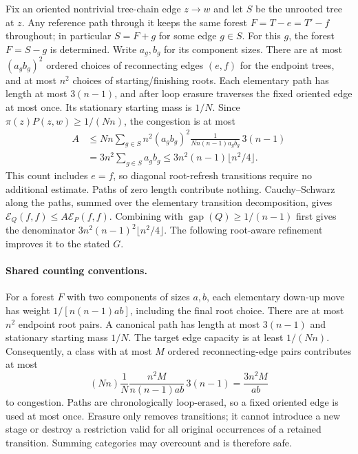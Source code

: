 \documentclass[11pt]{article}
\begin{document}
Fix an oriented nontrivial tree-chain edge $z\to w$ and let $S$ be
the unrooted tree at $z$. Any reference path through it keeps the
same forest $F=T-e=T'-f$ throughout; in particular $S=F+g$ for some
edge $g\in S$. For this $g$, the forest $F=S-g$ is determined.
Write $a_g,b_g$ for its component sizes. There are at most
$(a_gb_g)^2$ ordered choices of reconnecting edges $(e,f)$ for the
endpoint trees, and at most $n^2$ choices of starting/finishing roots.
Each elementary path has length at most $3(n-1)$, and after loop
erasure traverses the fixed oriented edge at most once. Its stationary
starting mass is $1/N$. Since $\pi(z)P(z,w)\ge1/(Nn)$, the congestion
is at most
\[
 \begin{split}
 A&\le Nn\sum_{g\in S}
 n^2(a_gb_g)^2\frac{1}{Nn(n-1)a_gb_g}\,3(n-1)\\
 &=3n^2\sum_{g\in S}a_gb_g
 \le3n^2(n-1)\lfloor n^2/4\rfloor.
 \end{split}
\]
This count includes $e=f$, so diagonal root-refresh transitions require
no additional estimate. Paths of zero length contribute nothing.
Cauchy--Schwarz along the paths, summed over the elementary transition
decomposition, gives $\mathcal E_Q(f,f)\le A\mathcal E_P(f,f)$.
Combining with $\operatorname{gap}(Q)\ge1/(n-1)$ first gives
the denominator $3n^2(n-1)^2\lfloor n^2/4\rfloor$. The following
root-aware refinement improves it to the stated $G$.

\paragraph{Shared counting conventions.}
For a forest $F$ with two components of sizes $a,b$, each elementary
down-up move has weight $1/[n(n-1)ab]$, including the final root choice.
There are at most $n^2$ endpoint root pairs. A canonical path has length
at most $3(n-1)$ and stationary starting mass $1/N$.
The target edge capacity is at least $1/(Nn)$. Consequently, a class
with at most $M$ ordered reconnecting-edge pairs contributes at most
\[
 (Nn)\frac{1}{N}\frac{n^2 M}{n(n-1)ab}\,3(n-1)
 =\frac{3n^2 M}{ab}
\]
to congestion. Paths are chronologically loop-erased, so a fixed
oriented edge is used at most once. Erasure only removes transitions;
it cannot introduce a new stage or destroy a restriction valid for
all original occurrences of a retained transition. Summing categories
may overcount and is therefore safe.
\end{document}
